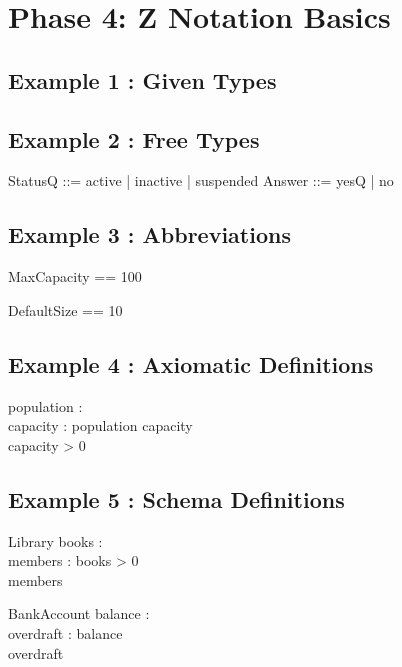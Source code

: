 \documentclass[a4paper,10pt,fleqn]{article}
\begin{document}
\section*{Phase 4: Z Notation Basics}

\subsection*{Example 1 : Given Types}

\begin{zed}
\end{zed}

\subsection*{Example 2 : Free Types}

\begin{zed}
StatusQ ::= active | inactive | suspended
\also
Answer ::= yesQ | no
\end{zed}

\subsection*{Example 3 : Abbreviations}

\begin{zed}
MaxCapacity == 100
\end{zed}

\begin{zed}
DefaultSize == 10
\end{zed}

\subsection*{Example 4 : Axiomatic Definitions}

\begin{axdef}
population : \nat \\
capacity : \nat
\where
population \leq capacity \\
capacity > 0
\end{axdef}

\subsection*{Example 5 : Schema Definitions}

\begin{schema}{Library}
books : \nat \\
members : \nat
\where
books > 0 \\
members 
\end{schema}

\begin{schema}{BankAccount}
balance : \nat \\
overdraft : \nat
\where
balance  \\
overdraft 
\end{schema}
\end{document}
